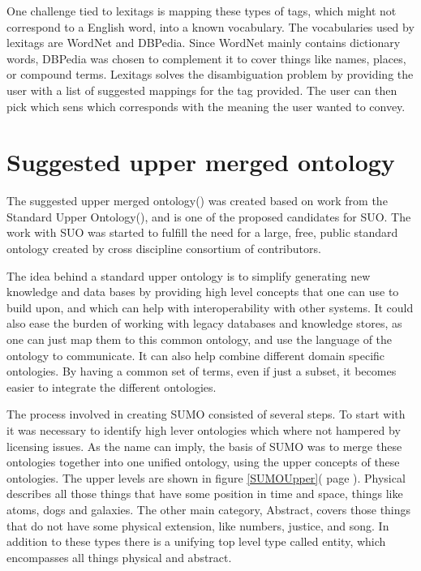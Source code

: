 One challenge tied to lexitags is mapping these types of tags,
which might not correspond to a English word, into a known vocabulary.
The vocabularies used by lexitags are WordNet and DBPedia.
Since WordNet mainly contains dictionary words,  
DBPedia was chosen to complement it to cover things like names, places, or compound terms.
Lexitags solves the disambiguation problem by providing the user with a list of suggested mappings for the tag provided.
The user can then pick which sens which corresponds with the meaning the user wanted to convey\citep{Veres2011}.

\section{Suggested upper merged ontology}
The suggested upper merged ontology() was created based on work from the Standard Upper Ontology(), 
and is one of the proposed candidates for SUO.
The work with SUO was started to fulfill the need for a large, free, public standard ontology
created by cross discipline consortium of contributors.

The idea behind a standard upper ontology is to simplify generating new knowledge and data bases 
by providing high level concepts that one can use to build upon, 
and which can help with interoperability with other systems. 
It could also ease the burden of working with legacy databases and knowledge stores, 
as one can just map them to this common ontology, and use the language of the ontology to communicate.
It can also help combine different domain specific ontologies. 
By having a common set of terms, even if just a subset, 
it becomes easier to integrate the different ontologies\citep{Niles2001}.

The process involved in creating SUMO consisted of several steps.
To start with it was necessary to identify high lever ontologies which where not hampered by licensing issues.
As the name can imply, the basis of SUMO was to merge these ontologies together into one unified ontology,
using the upper concepts of these ontologies. 
The upper levels are shown in figure \ref{SUMOUpper}( page \pageref{SUMOUpper}).
Physical describes all those things that have some position in time and space, things like atoms, dogs and galaxies.
The other main category, Abstract, covers those things that do not have some physical extension, like numbers,
justice, and song.
In addition to these types there is a unifying top level type called entity, which encompasses all things physical and abstract.

